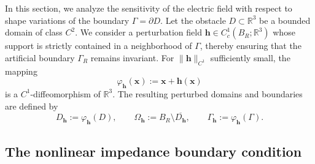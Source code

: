 \documentclass[12pt,reqno]{amsart}
\theoremstyle{definition}
\numberwithin{equation}{section}
\begin{document}
In this section, we analyze the sensitivity of the electric field with respect to shape variations of the boundary $\Gamma = \partial D$. Let the obstacle $D \subset \mathbb{R}^3$ be a bounded domain of class $C^2$. We consider a perturbation field $\mathbf{h} \in C_c^1(B_R; \mathbb{R}^3)$ whose support is strictly contained in a neighborhood of $\Gamma$, thereby ensuring that the artificial boundary $\Gamma_R$ remains invariant. For $\|\mathbf{h}\|_{C^1}$ sufficiently small, the mapping
\[
\varphi_{\mathbf{h}}(\boldsymbol{x}) := \boldsymbol{x} + \mathbf{h}(\boldsymbol{x})
\]
is a $C^1$-diffeomorphism of $\mathbb{R}^3$. The resulting perturbed domains and boundaries are defined by
\[
D_{\mathbf{h}} := \varphi_{\mathbf{h}}(D), \qquad \Omega_{\mathbf{h}} := B_R \setminus \overline{D_{\mathbf{h}}}, \qquad \Gamma_{\mathbf{h}} := \varphi_{\mathbf{h}}(\Gamma).
\]

\subsection{The nonlinear impedance boundary condition}
\end{document}

